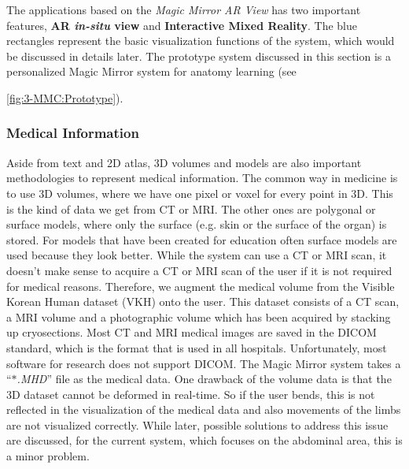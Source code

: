 The applications based on the \textit{Magic Mirror AR View} has two important features, \textbf{AR \textit{in-situ} view} and \textbf{Interactive Mixed Reality}. The blue rectangles represent the basic visualization functions of the system, which would be discussed in details later. The prototype system discussed in this section is a personalized Magic Mirror system for anatomy learning (see \figurename{\ref{fig:3-MMC:Prototype}). 

\subsubsection{Medical Information}
Aside from text and 2D atlas, 3D volumes and models are also important methodologies to represent medical information. The common way in medicine is to use 3D volumes, where we have one pixel or voxel for every point in 3D. This is the kind of data we get from CT or MRI. The other ones are polygonal or surface models, where only the surface (e.g. skin or the surface of the organ) is stored. For models that have been created for education often surface models are used because they look better.
While the system can use a CT or MRI scan, it doesn't make sense to acquire a CT or MRI scan of the user if it is not required for medical reasons. Therefore, we augment the medical volume from the Visible Korean Human dataset (VKH) \cite{Park2006} onto the user. This dataset consists of a CT scan, a MRI volume and a photographic volume which has been acquired by stacking up cryosections. 
Most CT and MRI medical images are saved in the DICOM standard, which is the format that is used in all hospitals. Unfortunately, most software for research does not support DICOM. The Magic Mirror system takes a ``\textit{$\ast$.MHD}'' file as the medical data. One drawback of the volume data is that the 3D dataset cannot be deformed in real-time. So if the user bends, this is not reflected in the visualization of the medical data and also movements of the limbs are not visualized correctly. While later, possible solutions to address this issue are discussed, for the current system, which focuses on the abdominal area, this is a minor problem.

}
